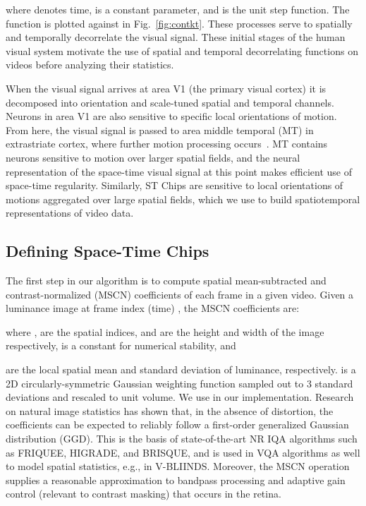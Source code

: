 \documentclass[journal]{IEEEtran}
\begin{document}
where  denotes time,  is a constant parameter, and  is the unit step function. The function is plotted against  in Fig.~\ref{fig:contkt}.
These processes serve to spatially and temporally decorrelate the visual signal. These initial stages of the human visual system motivate the use of spatial and temporal decorrelating functions on videos before analyzing their statistics. 

When the visual signal arrives at area V1 (the primary visual cortex) it is decomposed into orientation and scale-tuned spatial and temporal channels. Neurons in area V1 are also sensitive to specific local orientations of motion. From here, the visual signal is passed to area middle temporal (MT) in extrastriate cortex, where further motion processing occurs~\cite{simoncelliMT,movie}. MT contains neurons sensitive to motion over larger spatial fields, and the neural representation of the space-time visual signal at this point makes efficient use of space-time regularity. Similarly, ST Chips are sensitive to local orientations of motions aggregated over large spatial fields, which we use to build spatiotemporal representations of video data. 

\subsection{Defining Space-Time Chips}
The first step in our algorithm is to compute spatial mean-subtracted and contrast-normalized (MSCN) coefficients of each frame in a given video. Given a luminance image  at frame index (time) , the MSCN coefficients  are:

where ,  are the spatial indices,  and  are the height and width of the image respectively,  is a constant for numerical stability, and
  

are the local spatial mean and standard deviation of luminance, respectively.  is a 2D circularly-symmetric Gaussian weighting function sampled out to 3 standard deviations and rescaled to unit volume. We use  in our implementation. Research on natural image statistics \cite{brisque, friquee,higrade} has shown that, in the absence of distortion, the coefficients  can be expected to reliably follow a first-order generalized Gaussian distribution (GGD). This is the basis of state-of-the-art NR IQA algorithms such as FRIQUEE, HIGRADE, and BRISQUE, and is used in VQA algorithms as well to model spatial statistics, e.g., in V-BLIINDS. Moreover, the MSCN operation supplies a reasonable approximation to bandpass processing and adaptive gain control (relevant to contrast masking) that occurs in the retina. 
\end{document}

